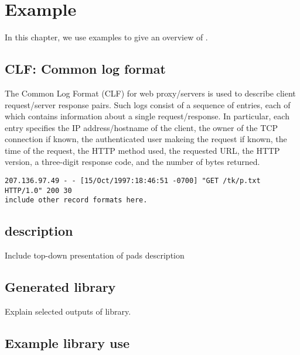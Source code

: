 \chapter{Example}
\label{chap:example}
In this chapter, we use examples to give an overview of \pads{}.

\section{CLF: Common log format}
\label{sec:example:common-log-format}
The Common Log Format (CLF) \cite{clf} for web proxy/servers is used
to describe client request/server response pairs.  Such logs consist
of a sequence of entries, each of which contains information about a
single request/response.  In particular, each entry specifies the IP
address/hostname of the client, the owner of the TCP connection if
known, the authenticated user makeing the request if known, the time
of the request, the HTTP method used, the requested URL, the HTTP
version, a three-digit response code, and the number of bytes
returned. 

\begin{verbatim}
207.136.97.49 - - [15/Oct/1997:18:46:51 -0700] "GET /tk/p.txt HTTP/1.0" 200 30
include other record formats here.
\end{verbatim}

\section{\padsl{} description}
\label{sec:example:padsl-description}
Include top-down presentation of pads description

\section{Generated library}
\label{sec:example:generated-library}
Explain selected outputs of library.

\section{Example library use}
\label{sec:example:library-use}